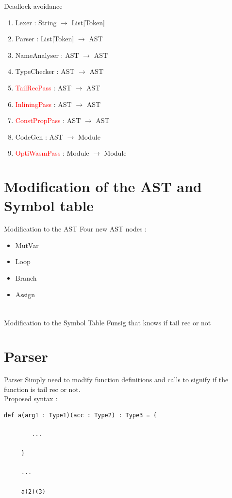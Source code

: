 \documentclass{beamer}
\renewcommand{\emph}{\textcolor{red}}
\begin{document}
\begin{frame}{Deadlock avoidance}
    \begin{enumerate}
        \item Lexer : String $\rightarrow$ List[Token]
        \item Parser : List[Token] $\rightarrow$ AST
        \item NameAnalyser : AST $\rightarrow$ AST
        \item TypeChecker : AST $\rightarrow$ AST
        \item \emph{TailRecPass} : AST $\rightarrow$ AST
        \item \emph{InliningPass} : AST $\rightarrow$ AST
        \item \emph{ConstPropPass} : AST $\rightarrow$ AST
        \item CodeGen : AST $\rightarrow$ Module
        \item \emph{OptiWasmPass} : Module $\rightarrow$ Module
    \end{enumerate}
\end{frame}

\section{Modification of the AST and Symbol table}
\begin{frame}{Modification to the AST}
Four new AST nodes :
\begin{itemize}
    \item MutVar
    \item Loop
    \item Branch
    \item Assign
\end{itemize}
\end{frame}

\section{}
\begin{frame}{Modification to the Symbol Table}
    Funsig that knows if tail rec or not
\end{frame}

\section{Parser}
\begin{frame}[fragile]{Parser}
     Simply need to modify function definitions and calls to signify if the function is tail rec or not. \\
     Proposed syntax :
     \begin{lstlisting}[basicstyle=\ttfamily]
     def a(arg1 : Type1)(acc : Type2) : Type3 = {
     
        ...
     
     }
     
     ...
     
     a(2)(3)
     \end{lstlisting}
\end{frame}
\end{document}

